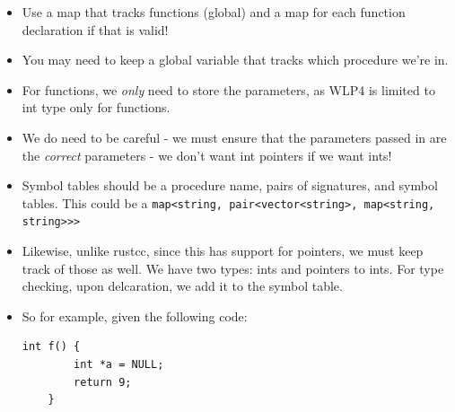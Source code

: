 \documentclass[12pt]{article}
\begin{document}
\begin{itemize}
    \item Use a map that tracks functions (global) and a map for each function declaration if that is valid!
    \item You may need to keep a global variable that tracks which procedure we're in.
    \item For functions, we \emph{only} need to store the parameters, as WLP4 is limited to int type only for functions.
    \item We do need to be careful - we must ensure that the parameters passed in are the \emph{correct} parameters - we don't want int pointers if we want ints!
    \item Symbol tables should be a procedure name, pairs of signatures, and symbol tables.  This could be a \lstinline[mathescape]{map<string, pair<vector<string>, map<string, string>>>}
    \item Likewise, unlike rustcc, since this has support for pointers, we must keep track of those as well.  We have two types: ints and pointers to ints.  For type checking, upon delcaration, we add it to the symbol table.
    \item So for example, given the following code:
        \begin{lstlisting}[mathescape, numbers=none, breaklines=true]
    int f() {
        int *a = NULL;
        return 9;
    }


\end{lstlisting}
\end{itemize}
\end{document}
